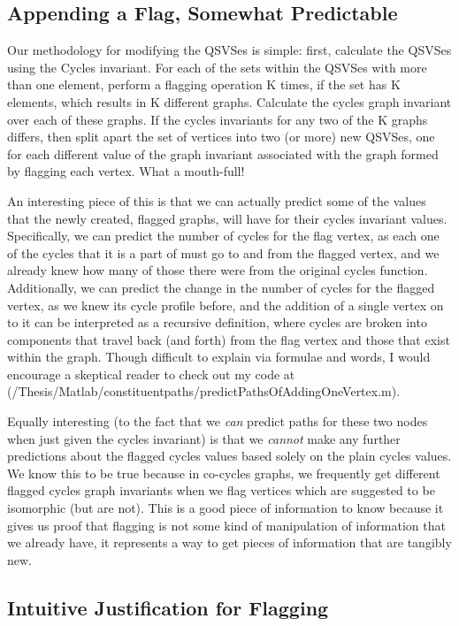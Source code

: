 \subsection{Appending a Flag, Somewhat Predictable}

Our methodology for modifying the QSVSes is simple: first, calculate the QSVSes using the Cycles invariant.
For each of the sets within the QSVSes with more than one element, perform a flagging operation K times, if the set has K elements, which results in K different graphs.
Calculate the cycles graph invariant over each of these graphs.
If the cycles invariants for any two of the K graphs differs, then split apart the set of vertices into two (or more) new QSVSes, one for each different value of the graph invariant associated with the graph formed by flagging each vertex.
What a mouth-full!

An interesting piece of this is that we can actually predict some of the values that the newly created, flagged graphs, will have for their cycles invariant values.
Specifically, we can predict the number of cycles for the flag vertex, as each one of the cycles that it is a part of must go to and from the flagged vertex, and we already knew how many of those there were from the original cycles function.
Additionally, we can predict the change in the number of cycles for the flagged vertex, as we knew its cycle profile before, and the addition of a single vertex on to it can be interpreted as a recursive definition, where cycles are broken into components that travel back (and forth) from the flag vertex and those that exist within the graph.
Though difficult to explain via formulae and words, I would encourage a skeptical reader to check out my code at (/Thesis/Matlab/constituentpaths/predictPathsOfAddingOneVertex.m).

Equally interesting (to the fact that we \emph{can} predict paths for these two nodes when just given the cycles invariant) is that we \emph{cannot} make any further predictions about the flagged cycles values based solely on the plain cycles values.
We know this to be true because in co-cycles graphs, we frequently get different flagged cycles graph invariants when we flag vertices which are suggested to be isomorphic (but are not).
This is a good piece of information to know because it gives us proof that flagging is not some kind of manipulation of information that we already have, it represents a way to get pieces of information that are tangibly new.

\subsection{Intuitive Justification for Flagging}

